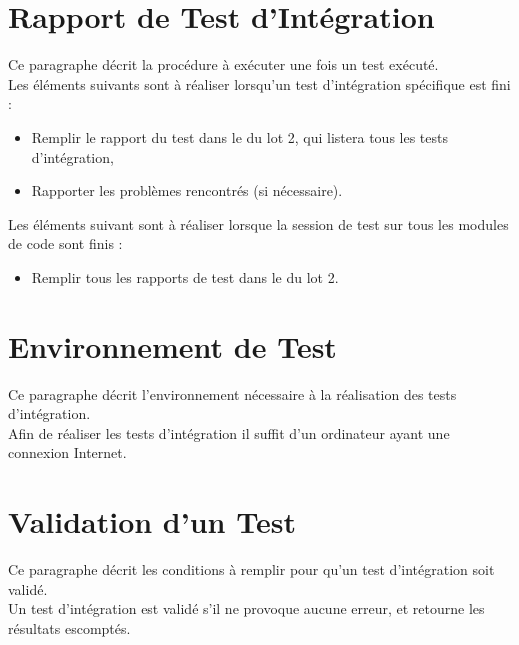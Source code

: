   \section{Rapport de Test d'Intégration}  
  	Ce paragraphe décrit la procédure à exécuter une fois un test exécuté.  \\
  	
  	Les éléments suivants sont à réaliser lorsqu'un test d'intégration spécifique est fini : 
  	\begin{itemize}
  		\item Remplir le rapport du test dans le \JTI du lot 2, qui listera tous les tests d'intégration,
  		\item Rapporter les problèmes rencontrés (si nécessaire).
  	\end{itemize}
  	
  	Les éléments suivant sont à réaliser lorsque la session de test sur tous les modules de code sont finis : 
  	\begin{itemize}
  		\item Remplir tous les rapports de test dans le \JTI du lot 2.
  	\end{itemize}
  
  \section{Environnement de Test}
	  Ce paragraphe décrit l'environnement nécessaire à la réalisation des tests d'intégration. \\
	  
	  Afin de réaliser les tests d'intégration il suffit d'un ordinateur ayant une connexion Internet.
  
  \section{Validation d'un Test}
	Ce paragraphe décrit les conditions à remplir pour qu'un test d'intégration soit validé.\\
  
  	Un test d'intégration est validé s'il ne provoque aucune erreur, et retourne les résultats escomptés. 
  	
  	